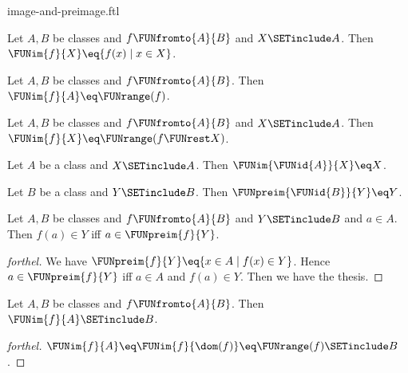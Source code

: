 \documentclass{naproche-library}
\begin{document}
\begin{smodule}[title=Computation Laws for Images and Preimages]{image-and-preimage.ftl}

\begin{proposition}[forthel,id=FOUNDATIONS_07_5919649206108160]
  Let $A, B$ be classes and $f \FUNfromto{A}{B}$ and $X \SETinclude A$.
  Then $\FUNim{f}{X} \eq \{ f(x) \mid x \in X \}$.
\end{proposition}

\begin{corollary}[forthel,id=FOUNDATIONS_07_5543924730953728]
  Let $A, B$ be classes and $f \FUNfromto{A}{B}$.
  Then $\FUNim{f}{A} \eq \FUNrange(f)$.
\end{corollary}

\begin{corollary}[forthel,id=FOUNDATIONS_07_1818812171157504]
  Let $A, B$ be classes and $f \FUNfromto{A}{B}$ and $X \SETinclude A$.
  Then $\FUNim{f}{X} \eq \FUNrange(f \FUNrest X)$.
\end{corollary}

\begin{proposition}[forthel,id=FOUNDATIONS_07_911395830890496]
  Let $A$ be a class and $X \SETinclude A$.
  Then $\FUNim{\FUNid{A}}{X} \eq X$.
\end{proposition}

\begin{proposition}[forthel,id=FOUNDATIONS_07_3349817830932480]
  Let $B$ be a class and $Y \SETinclude B$.
  Then $\FUNpreim{\FUNid{B}}{Y} \eq Y$.
\end{proposition}

\begin{proposition}[forthel,id=FOUNDATIONS_07_6362984433582080]
  Let $A, B$ be classes and $f \FUNfromto{A}{B}$ and $Y \SETinclude B$ and $a \in A$.
  Then $f(a) \in Y$ iff $a \in \FUNpreim{f}{Y}$.
\end{proposition}
\begin{proof}[forthel]
  We have $\FUNpreim{f}{Y} \eq \{ x \in A \mid f(x) \in Y \}$.
  Hence $a \in \FUNpreim{f}{Y}$ iff $a \in A$ and $f(a) \in Y$.
  Then we have the thesis.
\end{proof}

\begin{proposition}[forthel,id=FOUNDATIONS_07_6730546254184448]
  Let $A, B$ be classes and $f \FUNfromto{A}{B}$.
  Then $\FUNim{f}{A} \SETinclude B$.
\end{proposition}
\begin{proof}[forthel]
  $\FUNim{f}{A}
    \eq \FUNim{f}{\dom(f)}
    \eq \FUNrange(f)
    \SETinclude B$.
\end{proof}


\end{smodule}
\end{document}
